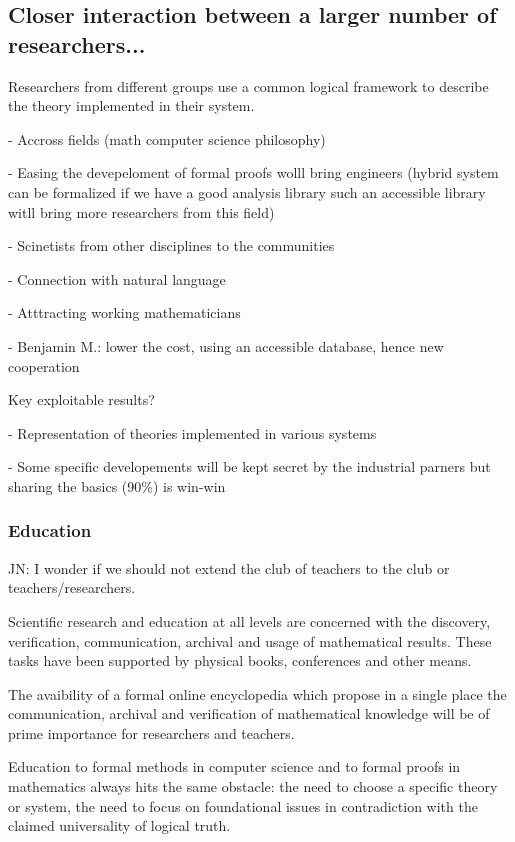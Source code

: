 \subsection{Closer interaction between a larger number of researchers...}


Researchers from different groups use a common logical framework to
describe the theory implemented in their system.

- Accross fields (math computer science philosophy)

- Easing the devepeloment of formal proofs wolll bring engineers
(hybrid system can be formalized if we have a good analysis library
such an accessible library witll bring more researchers from this
field)

- Scinetists from other disciplines to the communities

- Connection with natural language 

- Atttracting working mathematicians

- {\color{red} Benjamin M.}: lower the cost, using an accessible
database, hence new cooperation

{\color{red} Key exploitable results?}

- Representation of theories implemented in various systems

- Some specific developements will be kept secret by the industrial parners
but sharing the basics  (90\%) is win-win


\subsubsection{Education}

{\color{red} JN: I wonder if we should not extend the club of teachers to the club or teachers/researchers.}

Scientific research and education at all levels are concerned with the discovery, verification, communication, archival and usage of mathematical results.
These tasks have been supported by physical books, conferences and other means.

The avaibility of a formal online encyclopedia which propose in a single place the communication, archival and verification of mathematical  knowledge will be of prime importance for researchers and teachers.

Education to formal methods in computer science and to formal proofs
in mathematics always hits the same obstacle: the need to choose a
specific theory or system, the need to focus on foundational issues in contradiction with the claimed universality of logical truth. 

